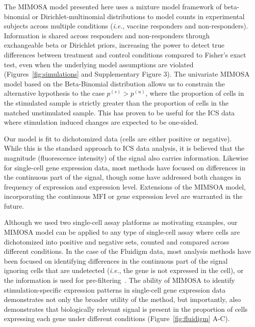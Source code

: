 \documentclass[12pt,oupdraft]{biostatistics}
\begin{document}
The MIMOSA model presented here uses a mixture model framework of beta-binomial or Dirichlet-multinomial distributions to model counts in experimental subjects across multiple conditions (\textit{i.e.}, vaccine responders and non-responders). Information is shared across responders and non-responders through exchangeable beta or Dirichlet priors, increasing the power to detect true differences between treatment and control conditions compared to Fisher's exact test, even when the underlying model assumptions are violated (Figures~\ref{fig:simulations} and Supplementary Figure 3). The univariate MIMOSA model based on the Beta-Binomial distribution allows us to constrain the alternative hypothesis to the case $p^{(s)} > p^{(u)}$, where the proportion of cells in the stimulated sample is strictly greater than the proportion of cells in the matched unstimulated sample. This has proven to be useful for the ICS data where stimulation induced changes are expected to be one-sided.

Our model is fit to dichotomized data  (cells are either positive or negative). While this is the standard approach to ICS data analysis, it is believed that the magnitude (fluorescence intensity) of the signal also carries information. Likewise for single-cell gene expression data, most methods have focused on differences in the continuous part of the signal, though some have addressed both changes in frequency of expression and expression level\cite{McDavid2012}. Extensions of the MIMSOA model, incorporating the continuous MFI or gene expression level are warranted in the future.

Although we used two single-cell assay platforms as motivating examples, our MIMOSA model can be applied to any type of single-cell assay where cells are dichotomized into positive and negative sets, counted and compared across different conditions.
In the case of the Fluidigm data, most analysis methods have been focused on identifying differences in the continuous part of the signal ignoring cells that are undetected (\textit{i.e.}, the gene is not expressed in the cell), or the information is used for pre-filtering~\citep{Flatz:2011jb}.
The ability of MIMOSA to identify stimulation-specific expression patterns in single-cell gene expression data demonstrates not only the broader utility of the method, but importantly, also demonstrates that biologically relevant signal is present in the proportion of cells expressing each gene under different conditions (Figure~\ref{fig:fluidigm} A-C).
\end{document}
